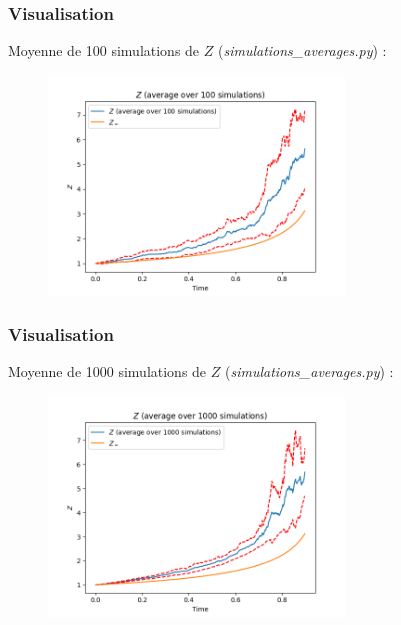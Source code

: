 \documentclass{beamer}
\begin{document}
\begin{frame}
\frametitle{Visualisation}
\par Moyenne de 100 simulations de $Z$ (\emph{simulations\_averages.py}) : 
\begin{figure}[H]
  \centering
    \includegraphics[width=0.7\textwidth]{images/average_100.png}
  \caption{}
\end{figure}
\end{frame}

\begin{frame}
\frametitle{Visualisation}
\par Moyenne de 1000 simulations de $Z$ (\emph{simulations\_averages.py}) : 
\begin{figure}[H]
  \centering
    \includegraphics[width=0.7\textwidth]{images/average_1000.png}
  \caption{}
\end{figure}
\end{frame}
\end{document}
